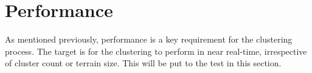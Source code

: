 \section{Performance}

As mentioned previously, performance is a key requirement for the clustering process. The target is for the clustering to perform in near real-time, irrespective of cluster count or terrain size. This will be put to the test in this section. 

